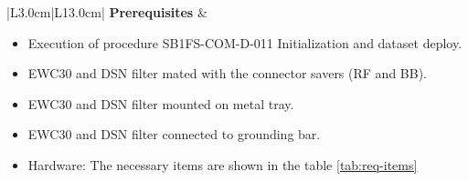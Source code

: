 \begin{table}[H]
\begin{tabular}{|L{3.0cm}|L{13.0cm}|}
				\textbf{Prerequisites} & 
		\begin{minipage}[t]{\linewidth}
			\begin{itemize}[nosep,after=\strut] 
				\item Execution of procedure SB1FS-COM-D-011 Initialization and dataset deploy.
				\item EWC30 and DSN filter mated with the connector savers (RF and BB).
				\item EWC30 and DSN filter mounted on \comEgse\xspace metal tray.
				\item EWC30 and DSN filter connected to grounding bar.
				\item Hardware: The necessary items are shown in the table \ref{tab:req-items} 
			\end{itemize} 
		\end{minipage}\\
		\hline
		
	\end{tabular}
	\caption{Procedure \procid \ description. } \label{tb:\procid-001}
\end{table}

